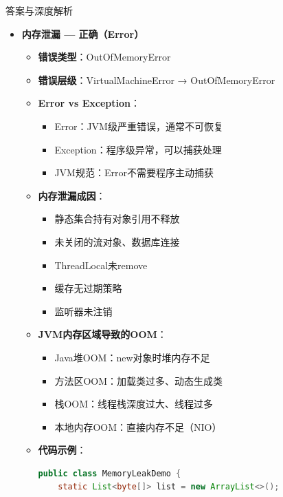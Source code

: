 \documentclass[12pt, a4paper]{ctexart}
\begin{document}
\begin{enumerate}[label=\textbf{\arabic*.}]
\begin{bluebox}{答案与深度解析}
\begin{itemize}[leftmargin=*, nosep, label={}]
			      \item[C] \textbf{内存泄漏 — 正确（Error）}
			            \begin{itemize}[label={}, leftmargin=*, nosep]
				            \item \textbf{错误类型}：OutOfMemoryError
				            \item \textbf{错误层级}：VirtualMachineError → OutOfMemoryError
				            \item \textbf{Error vs Exception}：
				                  \begin{itemize}[label={}, nosep]
					                  \item Error：JVM级严重错误，通常不可恢复
					                  \item Exception：程序级异常，可以捕获处理
					                  \item JVM规范：Error不需要程序主动捕获
				                  \end{itemize}
				            \item \textbf{内存泄漏成因}：
				                  \begin{itemize}[label={}, nosep]
					                  \item 静态集合持有对象引用不释放
					                  \item 未关闭的流对象、数据库连接
					                  \item ThreadLocal未remove
					                  \item 缓存无过期策略
					                  \item 监听器未注销
				                  \end{itemize}
				            \item \textbf{JVM内存区域导致的OOM}：
				                  \begin{itemize}[label={}, nosep]
					                  \item Java堆OOM：new对象时堆内存不足
					                  \item 方法区OOM：加载类过多、动态生成类
					                  \item 栈OOM：线程栈深度过大、线程过多
					                  \item 本地内存OOM：直接内存不足（NIO）
				                  \end{itemize}
				            \item \textbf{代码示例}：
				                  \begin{lstlisting}[language=Java]
public class MemoryLeakDemo {
    static List<byte[]> list = new ArrayList<>();


\end{lstlisting}
\end{itemize}
\end{itemize}
\end{bluebox}
\end{enumerate}
\end{document}
